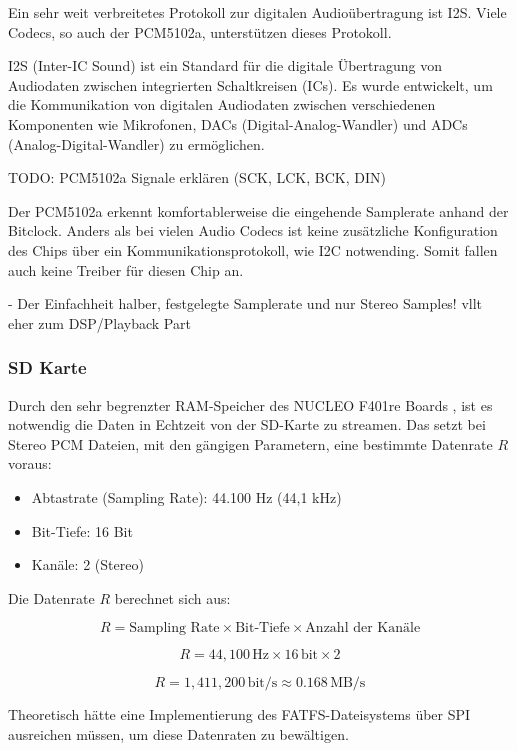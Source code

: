 Ein sehr weit verbreitetes Protokoll zur digitalen Audioübertragung ist I2S. Viele Codecs, so auch der PCM5102a, unterstützen dieses Protokoll.

I2S (Inter-IC Sound) ist ein Standard für die digitale Übertragung von Audiodaten zwischen integrierten Schaltkreisen (ICs). Es wurde entwickelt, um die Kommunikation von digitalen Audiodaten zwischen verschiedenen Komponenten wie Mikrofonen, DACs (Digital-Analog-Wandler) und ADCs (Analog-Digital-Wandler) zu ermöglichen. 

TODO: PCM5102a Signale erklären (SCK, LCK, BCK, DIN)

Der PCM5102a erkennt komfortablerweise die eingehende Samplerate anhand der Bitclock.
Anders als bei vielen Audio Codecs ist keine zusätzliche Konfiguration des Chips über ein Kommunikationsprotokoll, wie I2C notwending.
Somit fallen auch keine Treiber für diesen Chip an.

- Der Einfachheit halber, festgelegte Samplerate und nur Stereo Samples! vllt eher zum DSP/Playback Part


\subsubsection{SD Karte}

Durch den sehr begrenzter RAM-Speicher des NUCLEO F401re Boards , ist es notwendig die Daten in Echtzeit von der SD-Karte zu streamen. Das setzt bei Stereo PCM Dateien, mit den gängigen Parametern, eine bestimmte Datenrate \( R \) voraus:

\begin{itemize}
	\item Abtastrate (Sampling Rate): 44.100 Hz (44,1 kHz)
	\item Bit-Tiefe: 16 Bit
	\item Kanäle: 2 (Stereo)
\end{itemize}


Die Datenrate \( R \) berechnet sich aus:

\[
R = \text{Sampling Rate} \times \text{Bit-Tiefe} \times \text{Anzahl der Kanäle}
\]



\[
R = 44{,}100 \, \text{Hz} \times 16 \, \text{bit} \times 2
\]

\[
R = 1{,}411{,}200 \, \text{bit/s} \approx 0.168 \, \text{MB/s}
\]


Theoretisch hätte eine Implementierung des FATFS-Dateisystems über SPI ausreichen müssen, um diese Datenraten zu bewältigen. 


